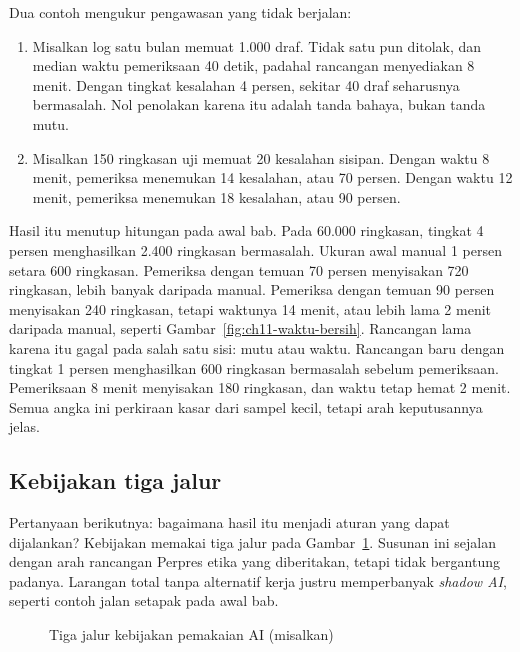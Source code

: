 Dua contoh mengukur pengawasan yang tidak berjalan:
\begin{enumerate}
  \item Misalkan log satu bulan memuat 1.000 draf. Tidak satu pun ditolak, dan median waktu
  pemeriksaan 40 detik, padahal rancangan menyediakan 8 menit. Dengan tingkat kesalahan 4 persen,
  sekitar 40 draf seharusnya bermasalah. Nol penolakan karena itu adalah tanda bahaya, bukan tanda
  mutu.
  \item Misalkan 150 ringkasan uji memuat 20 kesalahan sisipan. Dengan waktu 8 menit, pemeriksa
  menemukan 14 kesalahan, atau 70 persen. Dengan waktu 12 menit, pemeriksa menemukan 18 kesalahan,
  atau 90 persen.
\end{enumerate}

Hasil itu menutup hitungan pada awal bab. Pada 60.000 ringkasan, tingkat 4 persen menghasilkan 2.400
ringkasan bermasalah. Ukuran awal manual 1 persen setara 600 ringkasan. Pemeriksa dengan temuan 70
persen menyisakan 720 ringkasan, lebih banyak daripada manual. Pemeriksa dengan temuan 90 persen
menyisakan 240 ringkasan, tetapi waktunya 14 menit, atau lebih lama 2 menit daripada manual, seperti
Gambar~\ref{fig:ch11-waktu-bersih}. Rancangan lama karena itu gagal pada salah satu sisi: mutu atau
waktu. Rancangan baru dengan tingkat 1 persen menghasilkan 600 ringkasan bermasalah sebelum
pemeriksaan. Pemeriksaan 8 menit menyisakan 180 ringkasan, dan waktu tetap hemat 2 menit. Semua
angka ini perkiraan kasar dari sampel kecil, tetapi arah keputusannya jelas.

\subsection*{Kebijakan tiga jalur}

Pertanyaan berikutnya: bagaimana hasil itu menjadi aturan yang dapat dijalankan? Kebijakan memakai
tiga jalur pada Gambar~\ref{fig:ch11-jalur-kebijakan}. Susunan ini sejalan dengan arah rancangan
Perpres etika yang diberitakan, tetapi tidak bergantung padanya. Larangan total tanpa alternatif
kerja justru memperbanyak \textit{shadow AI}, seperti contoh jalan setapak pada awal bab.

\begin{figure}[!htb]
  \centering
  
  \caption{Tiga jalur kebijakan pemakaian AI (misalkan)}
  \label{fig:ch11-jalur-kebijakan}
\end{figure}

